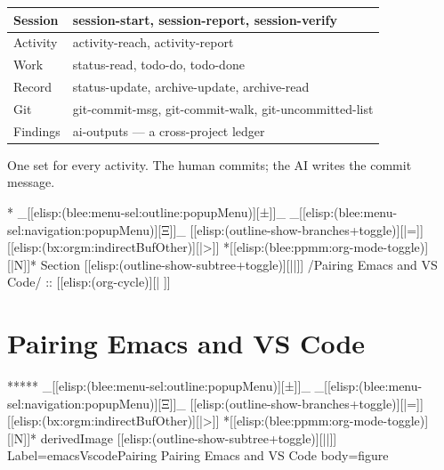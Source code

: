 \begin{whenOrg}
\begin{verblatex}
\begin{frame}[fragile,plain,label=bxCommands]
{\footnotesize \renewcommand{\arraystretch}{1.3}
  \begin{tabular}{|p{0.8in}|p{3.3in}|}
    \hline
    Session & session-start, session-report, session-verify \\
    \hline
    Activity & activity-reach, activity-report \\
    \hline
    Work & status-read, todo-do, todo-done \\
    \hline
    Record & status-update, archive-update, archive-read \\
    \hline
    Git & git-commit-msg, git-commit-walk, git-uncommitted-list \\
    \hline
    Findings & ai-outputs --- a cross-project ledger \\
    \hline
  \end{tabular}
  }

  \vspace{0.1in}
  One set for every activity. The human commits; the AI writes the commit message.


\end{frame}
\end{verblatex}



\begin{whenOrg}
*  _[[elisp:(blee:menu-sel:outline:popupMenu)][±]]_ _[[elisp:(blee:menu-sel:navigation:popupMenu)][Ξ]]_ [[elisp:(outline-show-branches+toggle)][|=]] [[elisp:(bx:orgm:indirectBufOther)][|>]] *[[elisp:(blee:ppmm:org-mode-toggle)][|N]]*  Section    [[elisp:(outline-show-subtree+toggle)][||]]   /Pairing Emacs and VS Code/ ::  [[elisp:(org-cycle)][| ]]
\end{whenOrg}

\section{Pairing Emacs and VS Code}

\begin{whenOrg}
*****  _[[elisp:(blee:menu-sel:outline:popupMenu)][±]]_ _[[elisp:(blee:menu-sel:navigation:popupMenu)][Ξ]]_ [[elisp:(outline-show-branches+toggle)][|=]] [[elisp:(bx:orgm:indirectBufOther)][|>]] *[[elisp:(blee:ppmm:org-mode-toggle)][|N]]*  derivedImage [[elisp:(outline-show-subtree+toggle)][||]] Label=emacsVscodePairing Pairing Emacs and VS Code body=figure
\end{whenOrg}


\end{whenOrg}
